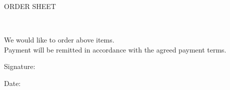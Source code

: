 \hfill
\parbox{\textwidth}{
  \centerline{\Large{ORDER SHEET}} \\
}
\normalsize
\vspace{0.5cm}
\hfill

\parbox [t]{\textwidth} {
   We would like to order above items. \\
   Payment will be remitted in accordance with the agreed payment terms. \\
}
\vspace{1.0cm}
\hfill

\parbox [t]{.5\textwidth} {
   Signature: \\ \hline
}
\parbox [t]{.3\textwidth} {
    Date: \\ \hline
}
